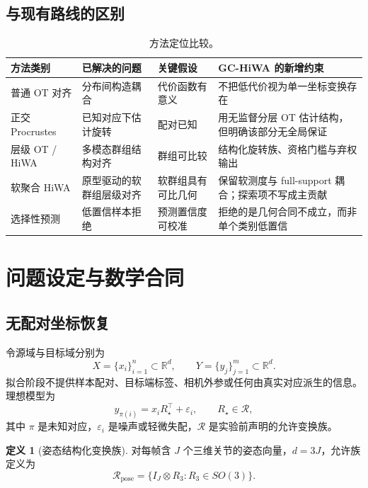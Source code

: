 \documentclass[10pt,a4paper,fontset=windows]{ctexart}
\newcommand{\RR}{\mathbb{R}}
\theoremstyle{definition}
\newtheorem{definition}[theorem]{定义}
\theoremstyle{remark}
\begin{document}
\subsection{与现有路线的区别}
\begin{table}[H]
\centering
\caption{方法定位比较。}
\label{tab:positioning}
\begin{tabularx}{0.96\linewidth}{lYYY}
\toprule
方法类别 & 已解决的问题 & 关键假设 & GC-HiWA 的新增约束\\
\midrule
普通 OT 对齐 & 分布间构造耦合 & 代价函数有意义 & 不把低代价视为单一坐标变换存在\\
正交 Procrustes & 已知对应下估计旋转 & 配对已知 & 用无监督分层 OT 估计结构，但明确该部分无全局保证\\
层级 OT / HiWA & 多模态群组结构对齐 & 群组可比较 & 结构化旋转族、资格门槛与弃权输出\\
软聚合 HiWA & 原型驱动的软群组层级对齐 & 软群组具有可比几何 & 保留软测度与 full-support 耦合；探索项不写成主贡献\\
选择性预测 & 低置信样本拒绝 & 预测置信度可校准 & 拒绝的是几何合同不成立，而非单个类别低置信\\
\bottomrule
\end{tabularx}
\end{table}

\section{问题设定与数学合同}
\label{sec:problem}

\subsection{无配对坐标恢复}
令源域与目标域分别为
\begin{equation}
X=\{x_i\}_{i=1}^{n}\subset\RR^d,\qquad
Y=\{y_j\}_{j=1}^{m}\subset\RR^d .
\end{equation}
拟合阶段不提供样本配对、目标端标签、相机外参或任何由真实对应派生的信息。理想模型为
\begin{equation}
y_{\pi(i)}=x_iR_\star^\top+\varepsilon_i,\qquad R_\star\in\mathcal R,
\label{eq:generative}
\end{equation}
其中 $\pi$ 是未知对应，$\varepsilon_i$ 是噪声或轻微失配，$\mathcal R$ 是实验前声明的允许变换族。

\begin{definition}[姿态结构化变换族]
对每帧含 $J$ 个三维关节的姿态向量，$d=3J$，允许族定义为
\begin{equation}
\mathcal R_{\mathrm{pose}}
=\{I_J\otimes R_3:R_3\in SO(3)\}.
\label{eq:pose-family}
\end{equation}
\end{definition}
\end{document}
